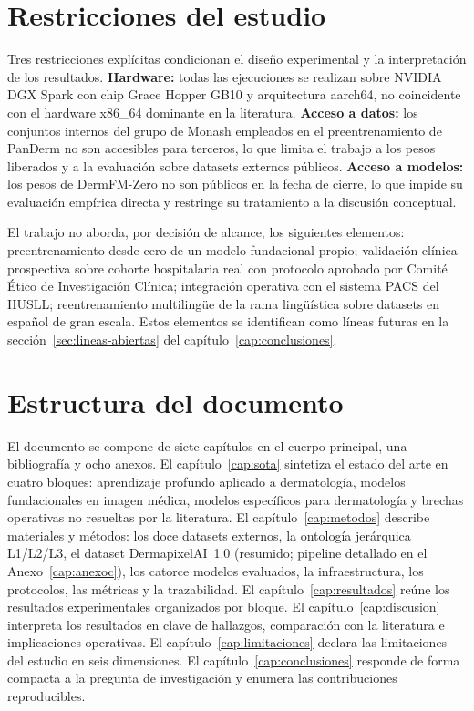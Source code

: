 \section{Restricciones del estudio}
\label{sec:alcance}

Tres restricciones explícitas condicionan el diseño experimental y
la interpretación de los resultados. \textbf{Hardware:} todas las
ejecuciones se realizan sobre NVIDIA DGX Spark con chip Grace
Hopper GB10 y arquitectura aarch64, no coincidente con el hardware
x86\_64 dominante en la literatura. \textbf{Acceso a datos:} los
conjuntos internos del grupo de Monash empleados en el
preentrenamiento de PanDerm no son accesibles para terceros, lo que
limita el trabajo a los pesos liberados y a la evaluación sobre
datasets externos públicos. \textbf{Acceso a modelos:} los pesos
de DermFM-Zero no son públicos en la fecha de cierre, lo que impide
su evaluación empírica directa y restringe su tratamiento a la
discusión conceptual.

El trabajo no aborda, por decisión de alcance, los siguientes
elementos: preentrenamiento desde cero de un modelo fundacional
propio; validación clínica prospectiva sobre cohorte hospitalaria
real con protocolo aprobado por Comité Ético de Investigación
Clínica; integración operativa con el sistema PACS del HUSLL;
reentrenamiento multilingüe de la rama lingüística sobre datasets en
español de gran escala. Estos elementos se identifican como líneas
futuras en la secci\'on~\ref{sec:lineas-abiertas} del
capítulo~\ref{cap:conclusiones}.


\section{Estructura del documento}
\label{sec:estructura}

El documento se compone de siete capítulos en el cuerpo principal,
una bibliografía y ocho anexos. El capítulo~\ref{cap:sota} sintetiza
el estado del arte en cuatro bloques: aprendizaje profundo aplicado
a dermatología, modelos fundacionales en imagen médica, modelos
específicos para dermatología y brechas operativas no resueltas por
la literatura. El capítulo~\ref{cap:metodos} describe materiales y
métodos: los doce datasets externos, la ontología jerárquica
L1/L2/L3, el dataset DermapixelAI~1.0 (resumido; pipeline detallado
en el Anexo~\ref{cap:anexoc}), los catorce modelos evaluados, la
infraestructura, los protocolos, las métricas y la trazabilidad. El
capítulo~\ref{cap:resultados} reúne los resultados experimentales
organizados por bloque. El capítulo~\ref{cap:discusion} interpreta
los resultados en clave de hallazgos, comparación con la literatura
e implicaciones operativas. El capítulo~\ref{cap:limitaciones}
declara las limitaciones del estudio en seis dimensiones. El
capítulo~\ref{cap:conclusiones} responde de forma compacta a la
pregunta de investigación y enumera las contribuciones
reproducibles.

